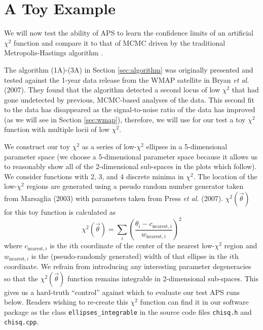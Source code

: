 \documentclass[useAMS,usenatbib]{aastex}
\begin{document}
\section{A Toy Example}
\label{sec:toy}

We will now test the ability of APS to learn the confidence limits of an
artificial $\chi^2$ function and compare it to that of MCMC driven by the
traditional Metropolis-Hastings algorithm \cite{mcmc,cosmomc}.

The algorithm (1A)-(3A) in Section \ref{sec:algorithm} 
was originally presented and tested against the 1-year data
release from the WMAP satellite in Bryan {\it et al}. (2007).  They found that
the algorithm detected a second locus of low $\chi^2$
that had gone undetected by previous, MCMC-based analyses of the data.  
This second fit to the data has disappeared as the signal-to-noise
ratio of the data has improved (as we will see in Section \ref{sec:wmap}),
therefore, we will use for our test a toy $\chi^2$ function
with multiple locii of low $\chi^2$.  

We construct our toy $\chi^2$ as a series of low-$\chi^2$ ellipses in a 5-dimensional
parameter space (we choose a 5-dimensional parameter space because it allows us to
reasonably show all of the 2-dimensional sub-spaces in the plots which follow).
We consider functions with 2, 3, and 4 discrete minima in $\chi^2$.
The location of the low-$\chi^2$ regions are generated using a pseudo random number
generator taken from Marsaglia (2003) with parameters taken from Press {\it et al.} (2007).
$\chi^2(\vec{\theta})$ for this toy function is calculated as 
\begin{equation}
\label{eqn:toychi}
\chi^2(\vec{\theta})=
\sum_i\left(\frac{\theta_i-c_{\text{nearest},i}}{w_{\text{nearest},i}}\right)^2
\end{equation}
where $c_{\text{nearest},i}$ is the $i$th coordinate of the center of the nearest low-$\chi^2$
region and $w_{\text{nearest},i}$ is the (pseudo-randomly generated) width of that ellipse in
the $i$th coordinate.  We refrain from introducing any interesting parameter degeneracies so
that the $\chi^2(\vec{\theta})$ function remains integrable in 2-dimensional sub-spaces.
This gives us a hard-truth ``control'' against which to evaluate our test APS runs below.
Readers wishing to re-create this $\chi^2$ function can find it in our software
package as the class \verb|ellipses_integrable| in the source code files \verb|chisq.h| and
\verb|chisq.cpp|.
\end{document}
